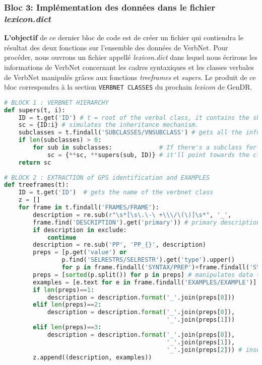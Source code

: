 \subsubsection{Bloc 3: Implémentation des données dans le fichier \emph{lexicon.dict}}

\textbf{L'objectif} de ce dernier bloc de code est de créer un fichier qui contiendra le résultat des deux fonctions sur l'ensemble des données de VerbNet. Pour procéder, nous ouvrons un fichier appellé \emph{lexicon.dict} dans lequel nous écrirons les informations de VerbNet concernant les cadres syntaxiques et les classes verbales de VerbNet manipulés grâces aux fonctions \emph{treeframes} et \emph{supers}. Le produit de ce bloc correspondra à la section \texttt{VERBNET CLASSES} du prochain \emph{lexicon} de GenDR.

\begin{lstlisting}[language=Python, caption = Importation de l'architecture des classes verbales, label=fig:archivn]
# BLOCK 1 : VERBNET HIERARCHY
def supers(t, i):
    ID = t.get('ID') # t = root of the verbal class, it contains the shared syntactic information.
    sc = {ID:i} # simulates the inheritance mechanism.
    subclasses = t.findall('SUBCLASSES/VNSUBCLASS') # gets all the information on the subclasses.
    if len(subclasses) > 0:
        for sub in subclasses:             # If there's a subclass for a given VNCLASS, 
            sc = {**sc, **supers(sub, ID)} # it'll point towards the class it's being dominated by.
    return sc
		
# BLOCK 2 : EXTRACTION of GPS identification and EXAMPLES
def treeframes(t):
    ID = t.get('ID')  # gets the name of the verbnet class
    z = []            
    for frame in t.findall('FRAMES/FRAME'):
        description = re.sub(r"\s*[\s\.\-\ +\\\/\(\)]\s*", '_',  
        frame.find('DESCRIPTION').get('primary')) # primary description = identification of a GP
        if description in exclude:
            continue
        description = re.sub('PP', 'PP_{}', description) 
        preps = [p.get('value') or 
                p.find('SELRESTRS/SELRESTR').get('type').upper()                  
                for p in frame.findall('SYNTAX/PREP')+frame.findall('SYNTAX/LEX')] 
        preps = [sorted(p.split()) for p in preps] # manipulates data to insert the prep. in desc.                                
        examples = [e.text for e in frame.findall('EXAMPLES/EXAMPLE')] # get ex. for each desc.
        if len(preps)==1:
            description = description.format('_'.join(preps[0]))
        elif len(preps)==2:
            description = description.format('_'.join(preps[0]),
                                             '_'.join(preps[1]))
        elif len(preps)==3:
            description = description.format('_'.join(preps[0]), 
                                             '_'.join(preps[1]), 
                                             '_'.join(preps[2])) # inserting preps in descriptions
        z.append((description, examples))
        

\end{lstlisting}
